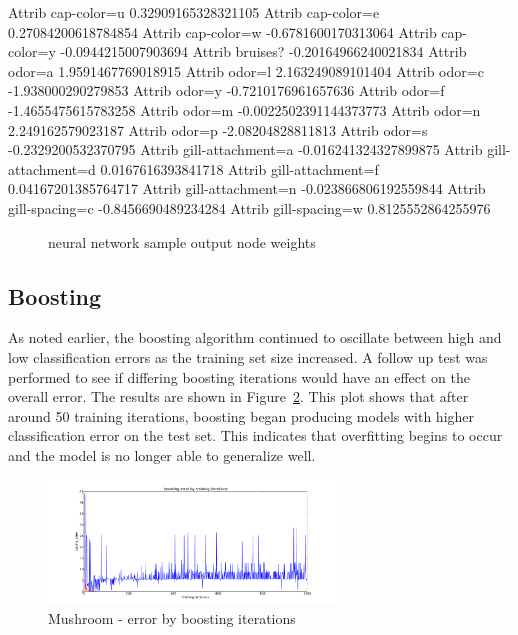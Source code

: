 \documentclass{sig-alternate}
\begin{document}
\begin{verbbox}
Attrib cap-color=u    0.32909165328321105
Attrib cap-color=e    0.27084200618784854
Attrib cap-color=w    -0.6781600170313064
Attrib cap-color=y    -0.0944215007903694
Attrib bruises?    -0.20164966240021834
Attrib odor=a    1.9591467769018915
Attrib odor=l    2.163249089101404
Attrib odor=c    -1.938000290279853
Attrib odor=y    -0.7210176961657636
Attrib odor=f    -1.4655475615783258
Attrib odor=m    -0.0022502391144373773
Attrib odor=n    2.249162579023187
Attrib odor=p    -2.08204828811813
Attrib odor=s    -0.2329200532370795
Attrib gill-attachment=a    -0.016241324327899875
Attrib gill-attachment=d    0.0167616393841718
Attrib gill-attachment=f    0.04167201385764717
Attrib gill-attachment=n    -0.023866806192559844
Attrib gill-spacing=c    -0.8456690489234284
Attrib gill-spacing=w    0.8125552864255976
\end{verbbox}

\begin{figure}[!htbp]
    \centering
    \theverbbox
    \caption{neural network sample output node weights \label{ag-nn-weights}}
\end{figure}


\subsection{Boosting}

As noted earlier, the boosting algorithm continued to oscillate between high and low classification errors as the training set size increased. A follow up test was performed to see if differing boosting iterations would have an effect on the overall error. The results are shown in Figure~\ref{ag-boost-iter}. This plot shows that after around 50 training iterations, boosting began producing models with higher classification error on the test set. This indicates that overfitting begins to occur and the model is no longer able to generalize well.

\begin{figure}[!htbp]
    \centering
    \includegraphics[width=3in]{data/agaricus-lepiota/boosting/training-iterations.pdf}
    \caption{Mushroom - error by boosting iterations \label{ag-boost-iter}}
\end{figure} 
\end{document}
